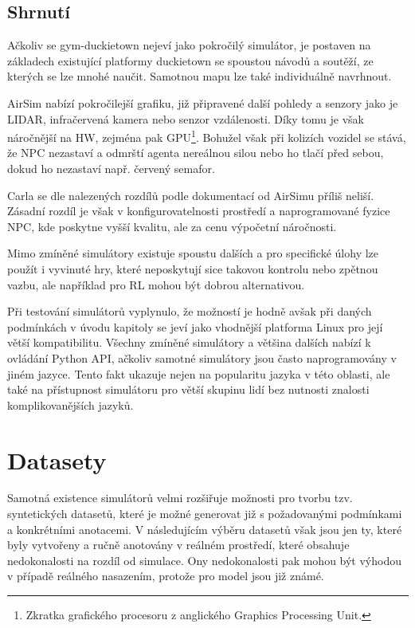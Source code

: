 \documentclass[czech, bc, kky, he, iso690numb]{fasthesis}
\begin{document}
	    	\subsection{Shrnutí}
	    		Ačkoliv se gym-duckietown nejeví jako pokročilý simulátor, je postaven na základech existující platformy duckietown se spoustou návodů a soutěží, ze kterých se lze mnohé naučit. Samotnou mapu lze také individuálně navrhnout.
	    		
	    		AirSim nabízí pokročilejší grafiku, již připravené další pohledy a senzory jako je LIDAR, infračervená kamera nebo senzor vzdálenosti. Díky tomu je však náročnější na HW, zejména pak GPU\footnote{Zkratka grafického procesoru z anglického Graphics Processing Unit.}. Bohužel však při kolizích vozidel se stává, že NPC nezastaví a odmrští agenta nereálnou silou nebo ho tlačí před sebou, dokud ho nezastaví např. červený semafor.
	    		
	    		Carla se dle nalezených rozdílů podle dokumentací od AirSimu příliš neliší. Zásadní rozdíl je však v konfigurovatelnosti prostředí a naprogramované fyzice NPC, kde poskytne vyšší kvalitu, ale za cenu výpočetní náročnosti.
	    		
	    		Mimo zmíněné simulátory existuje spoustu dalších a pro specifické úlohy lze použít i vyvinuté hry, které neposkytují sice takovou kontrolu nebo zpětnou vazbu, ale například pro RL mohou být dobrou alternativou.
	    		
	    		Při testování simulátorů vyplynulo, že možností je hodně avšak při daných podmínkách v úvodu kapitoly se jeví jako vhodnější platforma Linux pro její větší kompatibilitu. Všechny zmíněné simulátory a většina dalších nabízí k ovládání Python API, ačkoliv samotné simulátory jsou často naprogramovány v jiném jazyce. Tento fakt ukazuje nejen na popularitu jazyka v této oblasti, ale také na přístupnost simulátoru pro větší skupinu lidí bez nutnosti znalosti komplikovanějších jazyků.
	    		
    	\section{Datasety}
    		Samotná existence simulátorů velmi rozšiřuje možnosti pro tvorbu tzv. syntetických datasetů, které je možné generovat již s požadovanými podmínkami a konkrétními anotacemi. V následujícím výběru datasetů však jsou jen ty, které byly vytvořeny a ručně anotovány v reálném prostředí, které obsahuje nedokonalosti na rozdíl od simulace. Ony nedokonalosti pak mohou být výhodou v případě reálného nasazením, protože pro model jsou již známé.
    		
\end{document}
